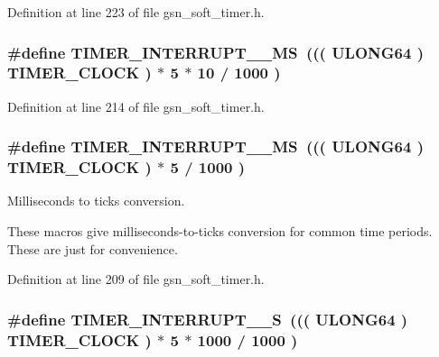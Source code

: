 Definition at line 223 of file gsn\_\-soft\_\-timer.h.

\hypertarget{a00673_gac0bd52bbc8f9d73f2e518d376e775d03}{
\subsubsection[{TIMER\_\-INTERRUPT\_\-50\_\-MS}]{\setlength{\rightskip}{0pt plus 5cm}\#define TIMER\_\-INTERRUPT\_\_\-MS~((( {\bf ULONG64} ) TIMER\_\-CLOCK ) $\ast$ 5 $\ast$ 10 / 1000 )}}
\label{a00673_gac0bd52bbc8f9d73f2e518d376e775d03}


Definition at line 214 of file gsn\_\-soft\_\-timer.h.

\hypertarget{a00673_ga85adb3cf09e71797fa296930193832b4}{
\subsubsection[{TIMER\_\-INTERRUPT\_\-5\_\-MS}]{\setlength{\rightskip}{0pt plus 5cm}\#define TIMER\_\-INTERRUPT\_\_\-MS~((( {\bf ULONG64} ) TIMER\_\-CLOCK ) $\ast$ 5 / 1000 )}}
\label{a00673_ga85adb3cf09e71797fa296930193832b4}


Milliseconds to ticks conversion. 

These macros give milliseconds-\/to-\/ticks conversion for common time periods. These are just for convenience. 

Definition at line 209 of file gsn\_\-soft\_\-timer.h.

\hypertarget{a00673_ga0e66fa016e02f9158c8c7ed5ca54c11d}{
\subsubsection[{TIMER\_\-INTERRUPT\_\-5\_\-S}]{\setlength{\rightskip}{0pt plus 5cm}\#define TIMER\_\-INTERRUPT\_\_\-S~((( {\bf ULONG64} ) TIMER\_\-CLOCK ) $\ast$ 5 $\ast$ 1000 / 1000 )}}
\label{a00673_ga0e66fa016e02f9158c8c7ed5ca54c11d}


